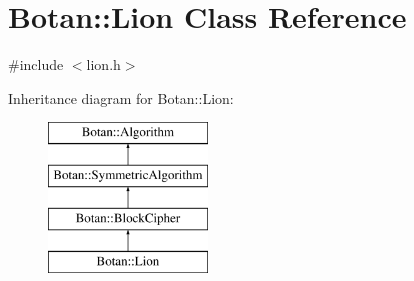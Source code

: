 \hypertarget{classBotan_1_1Lion}{\section{Botan\-:\-:Lion Class Reference}
\label{classBotan_1_1Lion}
}


{\ttfamily \#include $<$lion.\-h$>$}

Inheritance diagram for Botan\-:\-:Lion\-:\begin{figure}[H]
\begin{center}
\leavevmode
\includegraphics[height=4.000000cm]{classBotan_1_1Lion}
\end{center}
\end{figure}
